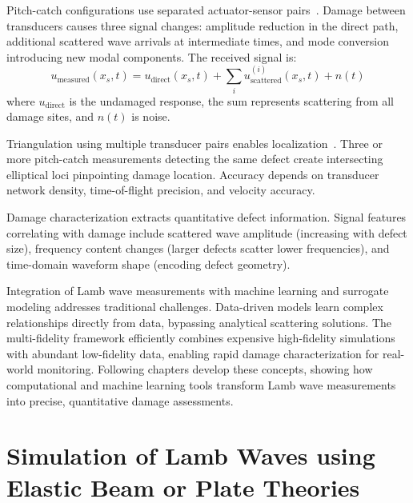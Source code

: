 \documentclass[12pt,a4paper]{report}
\begin{document}
Pitch-catch configurations use separated actuator-sensor pairs~\cite{su2009}. Damage between transducers causes three signal changes: amplitude reduction in the direct path, additional scattered wave arrivals at intermediate times, and mode conversion introducing new modal components. The received signal is:
\begin{equation}
u_{\text{measured}}(x_s, t) = u_{\text{direct}}(x_s, t) + \sum_{i} u_{\text{scattered}}^{(i)}(x_s, t) + n(t)
\end{equation}
where $u_{\text{direct}}$ is the undamaged response, the sum represents scattering from all damage sites, and $n(t)$ is noise.

Triangulation using multiple transducer pairs enables localization~\cite{giurgiutiu2008}. Three or more pitch-catch measurements detecting the same defect create intersecting elliptical loci pinpointing damage location. Accuracy depends on transducer network density, time-of-flight precision, and velocity accuracy.

Damage characterization extracts quantitative defect information. Signal features correlating with damage include scattered wave amplitude (increasing with defect size), frequency content changes (larger defects scatter lower frequencies), and time-domain waveform shape (encoding defect geometry).


Integration of Lamb wave measurements with machine learning and surrogate modeling addresses traditional challenges. Data-driven models learn complex relationships directly from data, bypassing analytical scattering solutions. The multi-fidelity framework efficiently combines expensive high-fidelity simulations with abundant low-fidelity data, enabling rapid damage characterization for real-world monitoring. Following chapters develop these concepts, showing how computational and machine learning tools transform Lamb wave measurements into precise, quantitative damage assessments.

\chapter{Simulation of Lamb Waves using Elastic Beam or Plate Theories}
\label{Introduce different 1D models and a reference 2D model}







 
\end{document}
